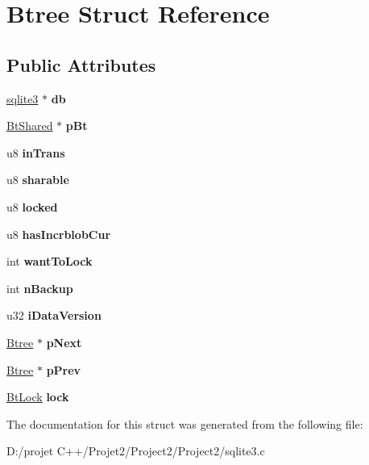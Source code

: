 \hypertarget{struct_btree}{}\section{Btree Struct Reference}
\label{struct_btree}
\subsection*{Public Attributes}
\begin{DoxyCompactItemize}
\item 
\mbox{\label{struct_btree_a2b3cfec48b6e9fcfd641d433816ae5c3}} 
\mbox{\hyperlink{structsqlite3}{sqlite3}} $\ast$ {\bfseries db}
\item 
\mbox{\label{struct_btree_a63bab5d744d48d14368af048dddf2f20}} 
\mbox{\hyperlink{struct_bt_shared}{Bt\+Shared}} $\ast$ {\bfseries p\+Bt}
\item 
\mbox{\label{struct_btree_a50007448960c05dfd1fdc7db3e277685}} 
u8 {\bfseries in\+Trans}
\item 
\mbox{\label{struct_btree_a114f157127c76a1fbad8292e4b39c4dd}} 
u8 {\bfseries sharable}
\item 
\mbox{\label{struct_btree_a16fc8292bae9a66cfec03f6cb82d06a8}} 
u8 {\bfseries locked}
\item 
\mbox{\label{struct_btree_a247c6bd4123c5d53ebb96bd879047e25}} 
u8 {\bfseries has\+Incrblob\+Cur}
\item 
\mbox{\label{struct_btree_a97368ea300f0b74b8e80ea07da0cea2a}} 
int {\bfseries want\+To\+Lock}
\item 
\mbox{\label{struct_btree_a7a3e7cf38bc9c3021a9e270a54ecfb1e}} 
int {\bfseries n\+Backup}
\item 
\mbox{\label{struct_btree_a333e24a5c4340e94bad7aa13aa36ae31}} 
u32 {\bfseries i\+Data\+Version}
\item 
\mbox{\label{struct_btree_a9e6d2ca44c10ed8ef0be004225a74ef5}} 
\mbox{\hyperlink{struct_btree}{Btree}} $\ast$ {\bfseries p\+Next}
\item 
\mbox{\label{struct_btree_a0423f1c55c1fe6812161a49bb2bf604f}} 
\mbox{\hyperlink{struct_btree}{Btree}} $\ast$ {\bfseries p\+Prev}
\item 
\mbox{\label{struct_btree_a943ed8799c9943f753a88cf44f1632dc}} 
\mbox{\hyperlink{struct_bt_lock}{Bt\+Lock}} {\bfseries lock}
\end{DoxyCompactItemize}


The documentation for this struct was generated from the following file\+:\begin{DoxyCompactItemize}
\item 
D\+:/projet C++/\+Projet2/\+Project2/\+Project2/sqlite3.\+c\end{DoxyCompactItemize}
